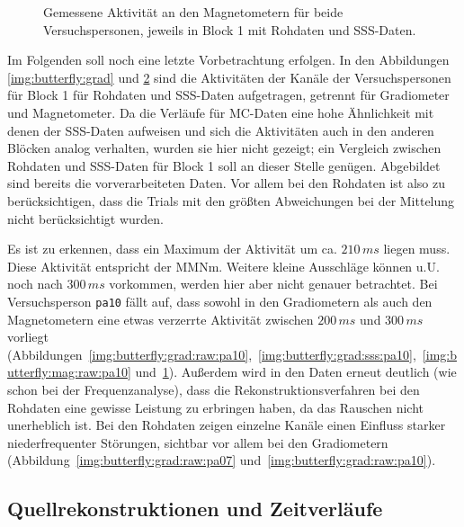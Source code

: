\documentclass[doc,a4paper,12pt]{apa6}
\begin{document}
\begin{figure}
\begin{subfigure}[c]{0.36\textwidth}
    \label{img:butterfly:mag:sss:pa10}
  \end{subfigure}
  \vspace*{3mm}
  \captionsetup{justification=justified}
  \caption[Gemessene Aktivität an den Magnetometern]{Gemessene Aktivität an den Magnetometern für beide Versuchspersonen, jeweils in Block 1 mit Rohdaten und SSS-Daten.}
  \label{img:butterfly:mag}
\end{figure}

Im Folgenden soll noch eine letzte Vorbetrachtung erfolgen. In den Abbildungen \ref{img:butterfly:grad} und \ref{img:butterfly:mag} sind die Aktivitäten der Kanäle der Versuchspersonen für Block 1 für Rohdaten und SSS-Daten aufgetragen, getrennt für Gradiometer und Magnetometer. Da die Verläufe für MC-Daten eine hohe Ähnlichkeit mit denen der SSS-Daten aufweisen und sich die Aktivitäten auch in den anderen Blöcken analog verhalten, wurden sie hier nicht gezeigt; ein Vergleich zwischen Rohdaten und SSS-Daten für Block 1 soll an dieser Stelle genügen. Abgebildet sind bereits die vorverarbeiteten Daten. Vor allem bei den Rohdaten ist also zu berücksichtigen, dass die Trials mit den größten Abweichungen bei der Mittelung nicht berücksichtigt wurden.

Es ist zu erkennen, dass ein Maximum der Aktivität um ca. $210\,ms$ liegen muss. Diese Aktivität entspricht der MMNm. Weitere kleine Ausschläge können u.U. noch nach $300\,ms$ vorkommen, werden hier aber nicht genauer betrachtet. Bei Versuchsperson \texttt{pa10} fällt auf, dass sowohl in den Gradiometern als auch den Magnetometern eine etwas verzerrte Aktivität zwischen $200\,ms$ und $300\,ms$ vorliegt (Abbildungen~\ref{img:butterfly:grad:raw:pa10},~\ref{img:butterfly:grad:sss:pa10},~\ref{img:butterfly:mag:raw:pa10} und~\ref{img:butterfly:mag:sss:pa10}). Außerdem wird in den Daten erneut deutlich (wie schon bei der Frequenzanalyse), dass die Rekonstruktionsverfahren bei den Rohdaten eine gewisse Leistung zu erbringen haben, da das Rauschen nicht unerheblich ist. Bei den Rohdaten zeigen einzelne Kanäle einen Einfluss starker niederfrequenter Störungen, sichtbar vor allem bei den Gradiometern (Abbildung~\ref{img:butterfly:grad:raw:pa07} und~\ref{img:butterfly:grad:raw:pa10}).

\subsection{Quellrekonstruktionen und Zeitverläufe}
\end{document}
